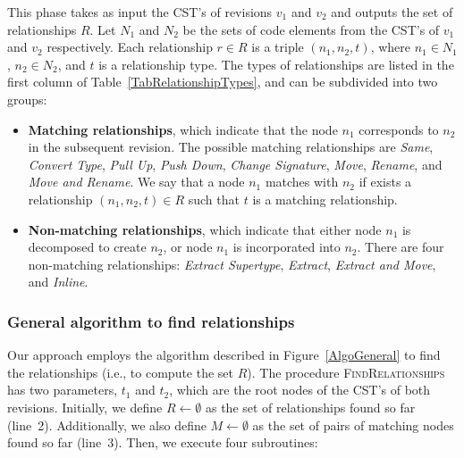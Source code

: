 This phase takes as input the CST's of revisions $v_1$ and $v_2$ and outputs the set of relationships $R$. Let $N_1$ and $N_2$ be the sets of code elements from the CST's of $v_1$ and $v_2$ respectively. Each relationship $r \in R$ is a triple $(n_1, n_2, t)$, where $n_1 \in N_1$, $n_2 \in N_2$, and $t$ is a relationship type. The types of relationships are listed in the first column of Table~\ref{TabRelationshipTypes}, and can be subdivided into two groups:
\begin{itemize}
\item \textbf{Matching relationships}, which indicate that the node $n_1$ corresponds to $n_2$ in the subsequent revision.
The possible matching relationships are \textit{Same}, \textit{Convert Type}, \textit{Pull Up}, \textit{Push Down}, \textit{Change Signature}, \textit{Move}, \textit{Rename}, and \textit{Move and Rename}.
We say that a node $n_1$ matches with $n_2$ if exists a relationship $(n_1, n_2, t) \in R$ such that $t$ is a matching relationship.

\item \textbf{Non-matching relationships}, which indicate that either node $n_1$ is decomposed to create $n_2$, or node $n_1$ is incorporated into $n_2$.
There are four non-matching relationships: \textit{Extract Supertype}, \textit{Extract}, \textit{Extract and Move}, and \textit{Inline}.
\end{itemize}


\subsubsection{General algorithm to find relationships}

Our approach employs the algorithm described in Figure~\ref{AlgoGeneral} to find the relationships (i.e., to compute the set $R$).
The procedure \textsc{FindRelationships} has two parameters, $t_1$ and $t_2$, which are the root nodes of the CST's of both revisions.
Initially, we define $R \gets \emptyset$ as the set of relationships found so far (line~2).
Additionally, we also define $M \gets \emptyset$ as the set of pairs of matching nodes found so far (line~3).
Then, we execute four subroutines:

